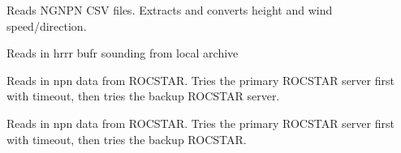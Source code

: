 \documentclass[letterpaper,10pt,english]{sphinxmanual}
\begin{document}

\begin{fulllineitems}
\label{\detokenize{index:compare_npn_to_model.read_npn_csv}}
Reads NGNPN CSV files.
Extracts and converts height and wind speed/direction.

\end{fulllineitems}


\begin{fulllineitems}
\label{\detokenize{index:compare_npn_to_model.retrieve_hrrr_winds}}
Reads in hrrr bufr sounding from local archive

\end{fulllineitems}


\begin{fulllineitems}
\label{\detokenize{index:compare_npn_to_model.retrieve_npn_winds}}
Reads in npn data from ROCSTAR.
Tries the primary ROCSTAR server first with timeout,
then tries the backup ROCSTAR server.

\end{fulllineitems}


\begin{fulllineitems}
\label{\detokenize{index:compare_npn_to_model.retrieve_raob}}
Reads in npn data from ROCSTAR.
Tries the primary ROCSTAR server first with timeout,
then tries the backup ROCSTAR.

\end{fulllineitems}
\end{document}

